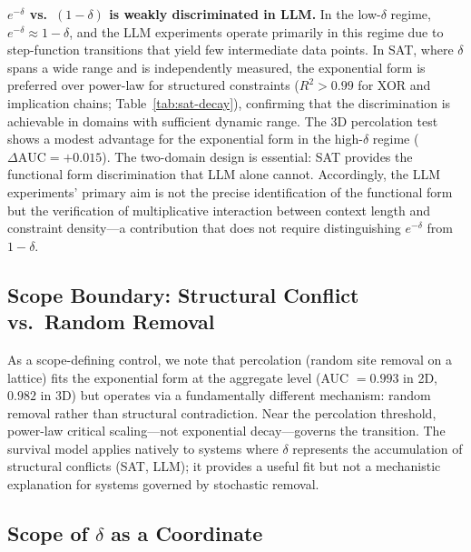 \documentclass[11pt,a4paper]{article}
\begin{document}
\textbf{$e^{-\delta}$ vs.\ $(1-\delta)$ is weakly discriminated in LLM.} In the low-$\delta$ regime, $e^{-\delta} \approx 1 - \delta$, and the LLM experiments operate primarily in this regime due to step-function transitions that yield few intermediate data points. In SAT, where $\delta$ spans a wide range and is independently measured, the exponential form is preferred over power-law for structured constraints ($R^2 > 0.99$ for XOR and implication chains; Table~\ref{tab:sat-decay}), confirming that the discrimination is achievable in domains with sufficient dynamic range. The 3D percolation test shows a modest advantage for the exponential form in the high-$\delta$ regime ($\Delta\text{AUC} = +0.015$). The two-domain design is essential: SAT provides the functional form discrimination that LLM alone cannot. Accordingly, the LLM experiments' primary aim is not the precise identification of the functional form but the verification of multiplicative interaction between context length and constraint density---a contribution that does not require distinguishing $e^{-\delta}$ from $1-\delta$.

\subsection{Scope Boundary: Structural Conflict vs.\ Random Removal}

As a scope-defining control, we note that percolation (random site removal on a lattice) fits the exponential form at the aggregate level (AUC $= 0.993$ in 2D, $0.982$ in 3D) but operates via a fundamentally different mechanism: random removal rather than structural contradiction. Near the percolation threshold, power-law critical scaling---not exponential decay---governs the transition. The survival model applies natively to systems where $\delta$ represents the accumulation of structural conflicts (SAT, LLM); it provides a useful fit but not a mechanistic explanation for systems governed by stochastic removal.

\subsection{Scope of \texorpdfstring{$\delta$}{δ} as a Coordinate}
\label{sec:delta-scope}
\end{document}
